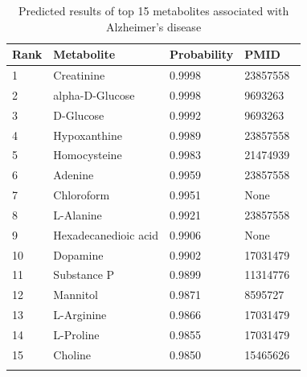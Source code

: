 \documentclass[lettersize,journal]{IEEEtran}
\begin{document}
\begin{table}[h]
	\centering
	\vspace{-3mm} %
	\caption{Predicted results of top 15 metabolites associated with Alzheimer's disease}
	\begin{tabular}{llll}
		\toprule
		Rank & Metabolite & Probability & PMID \\ 
		\midrule

		1 &	Creatinine &	0.9998  &	23857558 \\
		2 &	alpha-D-Glucose &	0.9998 & 	9693263\\
		3 &	D-Glucose &	0.9992 & 	9693263 \\
		4 &	Hypoxanthine &	0.9989 & 	23857558 \\
		5 &	Homocysteine &	0.9983  &	21474939\\
		6 &	Adenine &	0.9959  &	23857558\\
		7 &	Chloroform &	0.9951 & 	None \\
		8 &	L-Alanine &	0.9921 &	23857558 \\
		9 &	Hexadecanedioic acid &	0.9906 & 	None\\
		10 &	Dopamine &	0.9902 &	17031479 \\
		11 &	Substance P &	0.9899 &	11314776\\
		12 &	Mannitol &	0.9871 &	8595727 \\
		13 &	L-Arginine &	0.9866 &	17031479 \\
		14 &	L-Proline &	0.9855 &	17031479 \\
		15 &	Choline &	0.9850 &	15465626\\
		
		\bottomrule
		\vspace{-5mm} %
		\label{table3}
	\end{tabular}
\end{table}
\end{document}
